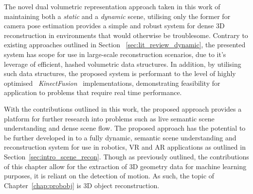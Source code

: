 The novel dual volumetric representation approach taken in this work of maintaining both a 
\textit{static} and a \textit{dynamic} scene, utilising only the former for camera pose 
estimation provides a simple and robust system for dense 3D reconstruction in environments 
that would otherwise be troublesome. Contrary to existing approaches outlined in Section 
~\ref{sec:lit_review_dynamic}, the presented system has scope for use in large-scale 
reconstruction scenarios, due to it's leverage of efficient, hashed volumetric data structures. 
In addition, by utilising such data structures, the proposed system is performant to the 
level of highly optimised~\cite{Prisacariu2014} \textit{KinectFusion}~\cite{Newcombe2011} 
implementations, demonstrating feasibility for application to problems that require 
real time performance.

With the contributions outlined in this work, the proposed approach provides a platform 
for further research into problems such as live semantic scene understanding and dense scene 
flow. The proposed approach has the potential to be further developed in to a fully dynamic, 
semantic scene understanding and reconstruction system for use in robotics, VR and AR applications 
as outlined in Section~\ref{sec:intro_scene_recon}. Though as previously outlined, the contributions 
of this chapter allow for the extraction of 3D geometry data for machine learning purposes, it is 
reliant on the detection of motion. As such, the topic of Chapter~\ref{chap:probobj} is 3D object 
reconstruction.
